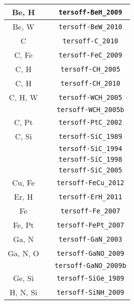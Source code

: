 \begin{table}
{\begin{center}
\begin{tabular}{ccc}
      \hline
      Be, H & \cite{0953-8984-21-44-445002} & \verb+tersoff-BeH_2009+\\
      \hline
      Be, W & \cite{bjorkas2010w} & \verb+tersoff-BeW_2010+\\
      \hline
      C & \cite{lindsay2010optimized} & \verb+tersoff-C_2010+\\
      \hline
      C, Fe & \cite{henriksson2009simulations} & \verb+tersoff-FeC_2009+\\
      \hline
      C, H & \cite{juslin2005analytical} & \verb+tersoff-CH_2005+\\
      C, H & \cite{juslin2005analytical,lindsay2010optimized} & \verb+tersoff-CH_2010+\\
      \hline
      C, H, W & \cite{juslin2005analytical} & \verb+tersoff-WCH_2005+\\
              & \cite{juslin2005analytical,erhart2005analytical} & \verb+tersoff-WCH_2005b+\\
      \hline
      C, Pt & \cite{albe2002modelingB}& \verb+tersoff-PtC_2002+\\
      \hline
      C, Si & \cite{tersoff89,tersoff1990erratum} & \verb+tersoff-SiC_1989+\\
      & \cite{tersoff1994chemical} &  \verb+tersoff-SiC_1994+\\
      & \cite{devanathan1998displacement} & \verb+tersoff-SiC_1998+\\
      & \cite{erhart2005analytical} & \verb+tersoff-SiC_2005+\\
      \hline
      Cu, Fe & \cite{hou2012analytic} & \verb+tersoff-FeCu_2012+\\
      \hline
      Er, H & \cite{peng2011bond} & \verb+tersoff-ErH_2011+\\
      \hline
      Fe & \cite{muller2007analytic} & \verb+tersoff-Fe_2007+\\
      \hline
      Fe, Pt & \cite{muller2007thermodynamics} & \verb+tersoff-FePt_2007+\\
      \hline
      Ga, N & \cite{nord2003modelling} & \verb+tersoff-GaN_2003+\\
      \hline
      Ga, N, O & \cite{okeke2009molecular} & \verb+tersoff-GaNO_2009+\\
      & \cite{okeke2009molecular} & \verb+tersoff-GaNO_2009b+\\
      \hline
      Ge, Si & \cite{tersoff89,tersoff1990erratum} & \verb+tersoff-SiGe_1989+\\
      \hline
      H, N, Si & \cite{de1999hydrogen} & \verb+tersoff-SiNH_2009+\\

\end{tabular}
\end{center}}
\end{table}
